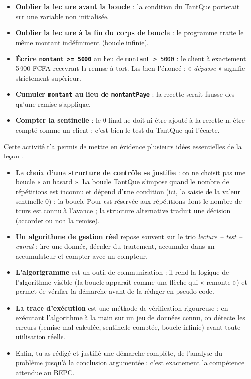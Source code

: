 \documentclass[11pt]{article}
\newcommand{\cle}[1]{{\popxbold\color{popdark}#1}}
\newcounter{popsec}
\newcounter{popsub}
\newcommand{\courssub}[1]{%
  \stepcounter{popsub}%
  \par\vspace{9pt}\noindent{\popxbold\fontsize{11.5}{13}\selectfont\color{popink}{\color{poporange}\thepopsec.\thepopsub}\hspace{6pt}#1}\par\nopagebreak\vspace{4pt}
}
\begin{document}
\begin{attention}
\begin{itemize}
\item \textbf{Oublier la lecture avant la boucle} : la condition du TantQue porterait sur une variable non initialisée.
\item \textbf{Oublier la lecture à la fin du corps de boucle} : le programme traite le même montant indéfiniment (boucle infinie).
\item \textbf{Écrire \texttt{montant >= 5000}} au lieu de \texttt{montant > 5000} : le client à exactement 5\,000 FCFA recevrait la remise à tort. Lis bien l'énoncé : « \emph{dépasse} » signifie strictement supérieur.
\item \textbf{Cumuler \texttt{montant} au lieu de \texttt{montantPaye}} : la recette serait fausse dès qu'une remise s'applique.
\item \textbf{Compter la sentinelle} : le 0 final ne doit ni être ajouté à la recette ni être compté comme un client ; c'est bien le test du TantQue qui l'écarte.
\end{itemize}
\end{attention}

\courssub{Bilan de l'activité}

Cette activité t'a permis de mettre en évidence plusieurs idées essentielles de la leçon :

\begin{itemize}
\item \textbf{Le choix d'une structure de contrôle se justifie} : on ne choisit pas une boucle « au hasard ». La boucle \cle{TantQue} s'impose quand le nombre de répétitions est inconnu et dépend d'une condition (ici, la saisie de la valeur sentinelle 0) ; la boucle \cle{Pour} est réservée aux répétitions dont le nombre de tours est connu à l'avance ; la structure \cle{alternative} traduit une décision (accorder ou non la remise).
\item \textbf{Un algorithme de gestion réel} repose souvent sur le trio \emph{lecture -- test -- cumul} : lire une donnée, décider du traitement, accumuler dans un \cle{accumulateur} et compter avec un \cle{compteur}.
\item \textbf{L'algorigramme} est un outil de communication : il rend la logique de l'algorithme visible (la boucle apparaît comme une flèche qui « remonte ») et permet de vérifier la démarche avant de la rédiger en pseudo-code.
\item \textbf{La trace d'exécution} est une méthode de vérification rigoureuse : en exécutant l'algorithme à la main sur un jeu de données connu, on détecte les erreurs (remise mal calculée, sentinelle comptée, boucle infinie) avant toute utilisation réelle.
\item Enfin, tu as rédigé et justifié une démarche complète, de l'analyse du problème jusqu'à la conclusion argumentée : c'est exactement la compétence attendue au BEPC.
\end{itemize}
\end{document}
